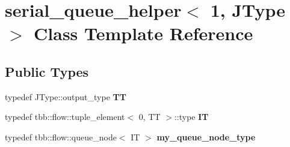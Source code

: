 \hypertarget{classserial__queue__helper_3_011_00_01JType_01_4}{}\section{serial\+\_\+queue\+\_\+helper$<$ 1, J\+Type $>$ Class Template Reference}
\label{classserial__queue__helper_3_011_00_01JType_01_4}
\subsection*{Public Types}
\begin{DoxyCompactItemize}
\item 
\hypertarget{classserial__queue__helper_3_011_00_01JType_01_4_a7df22e53f02945fa4c52c550b82dab38}{}typedef J\+Type\+::output\+\_\+type {\bfseries T\+T}\label{classserial__queue__helper_3_011_00_01JType_01_4_a7df22e53f02945fa4c52c550b82dab38}

\item 
\hypertarget{classserial__queue__helper_3_011_00_01JType_01_4_af2da50871837d95a1e0c72fcefcf7fc6}{}typedef tbb\+::flow\+::tuple\+\_\+element$<$ 0, T\+T $>$\+::type {\bfseries I\+T}\label{classserial__queue__helper_3_011_00_01JType_01_4_af2da50871837d95a1e0c72fcefcf7fc6}

\item 
\hypertarget{classserial__queue__helper_3_011_00_01JType_01_4_afcd32867401e30db856cf49ddf53a2b7}{}typedef tbb\+::flow\+::queue\+\_\+node$<$ I\+T $>$ {\bfseries my\+\_\+queue\+\_\+node\+\_\+type}\label{classserial__queue__helper_3_011_00_01JType_01_4_afcd32867401e30db856cf49ddf53a2b7}

\end{DoxyCompactItemize}
